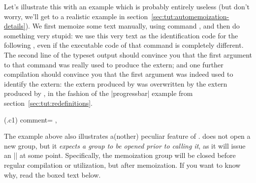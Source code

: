\documentclass[a4paper,11pt]{article}
\begin{document}
Let's illustrate this with an example which is probably entirely useless (but
don't worry, we'll get to a realistic example in
section~\ref{sec:tut:automemoization-details}).  We first memoize some text
manually, using command , and then do something very stupid: we use
this very text as the identification code for the following ,
even if the executable code of that command is completely different.  The
second line of the typeset output should convince you that the first argument
to that command was really used to produce the extern; and one further
compilation should convince you that the first argument was indeed used to
identify the extern: the extern produced by  was overwritten by the
extern produced by , in the fashion of the |progressbar|
example from section~\ref{sec:tut:redefinitions}.

(.c1){
  comment={%
    \hfill
  },
}

The example above also illustrates a(nother) peculiar feature of
.   does not open a new  group, but
it \emph{expects a group to be opened prior to calling it}, as it will issue an
|\endgroup| at some point.  Specifically, the memoization group will be closed
before regular compilation or utilization, but after memoization.  If you want
to know why, read the boxed text below.
\end{document}
